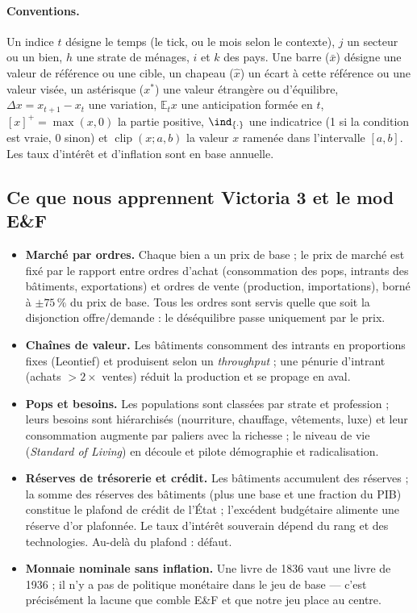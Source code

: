 \documentclass[11pt,a4paper]{article}
\newcommand{\E}{\mathbb{E}}
\newcommand{\pos}[1]{{\left[#1\right]^{+}}}
\begin{document}
\paragraph{Conventions.} Un indice $t$ désigne le temps (le tick, ou le mois selon le contexte), $j$ un secteur ou un bien, $h$ une strate de ménages, $i$ et $k$ des pays. Une barre ($\bar x$) désigne une valeur de référence ou une cible, un chapeau ($\hat x$) un écart à cette référence ou une valeur visée, un astérisque ($x^\ast$) une valeur étrangère ou d'équilibre, $\Delta x = x_{t+1}-x_t$ une variation, $\E_t x$ une anticipation formée en $t$, $\pos{x}=\max(x,0)$ la partie positive, $\ind_{\{\cdot\}}$ une indicatrice (1 si la condition est vraie, 0 sinon) et $\operatorname{clip}(x;a,b)$ la valeur $x$ ramenée dans l'intervalle $[a,b]$. Les taux d'intérêt et d'inflation sont en base annuelle.

\subsection{Ce que nous apprennent Victoria 3 et le mod E\&F}

\begin{vic}
\begin{itemize}
\item \textbf{Marché par ordres.} Chaque bien a un prix de base ; le prix de marché est fixé par le rapport entre ordres d'achat (consommation des pops, intrants des bâtiments, exportations) et ordres de vente (production, importations), borné à $\pm 75\,\%$ du prix de base. Tous les ordres sont servis quelle que soit la disjonction offre/demande : le déséquilibre passe uniquement par le prix.
\item \textbf{Chaînes de valeur.} Les bâtiments consomment des intrants en proportions fixes (Leontief) et produisent selon un \emph{throughput} ; une pénurie d'intrant (achats $> 2\times$ ventes) réduit la production et se propage en aval.
\item \textbf{Pops et besoins.} Les populations sont classées par strate et profession ; leurs besoins sont hiérarchisés (nourriture, chauffage, vêtements, luxe) et leur consommation augmente par paliers avec la richesse ; le niveau de vie (\emph{Standard of Living}) en découle et pilote démographie et radicalisation.
\item \textbf{Réserves de trésorerie et crédit.} Les bâtiments accumulent des réserves ; la somme des réserves des bâtiments (plus une base et une fraction du PIB) constitue le plafond de crédit de l'État ; l'excédent budgétaire alimente une réserve d'or plafonnée. Le taux d'intérêt souverain dépend du rang et des technologies. Au-delà du plafond : défaut.
\item \textbf{Monnaie nominale sans inflation.} Une livre de 1836 vaut une livre de 1936 ; il n'y a pas de politique monétaire dans le jeu de base --- c'est précisément la lacune que comble E\&F et que notre jeu place au centre.
\end{itemize}
\end{vic}
\end{document}
